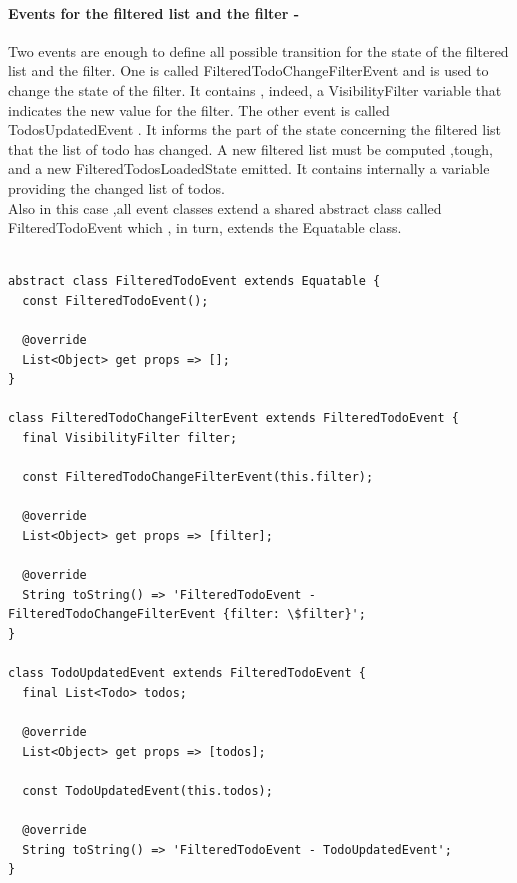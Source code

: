 \paragraph{Events for the filtered list and the filter - }
\label{subpar:todo_app_bloc_core_state}

Two events are enough to define all possible transition for the state of the filtered list and the filter. One is called FilteredTodoChangeFilterEvent and is used to change the state of the filter. It contains , indeed, a VisibilityFilter variable  that indicates the new value for the filter. The other event is called TodosUpdatedEvent . It informs the part of the state concerning the filtered list that the list of todo has changed. A new filtered list must be computed ,tough, and a new FilteredTodosLoadedState emitted. It contains internally a variable providing the changed list of todos.\\
Also in this case ,all event classes extend a shared abstract class called FilteredTodoEvent which , in turn, extends the Equatable class. 

\begin{code}
\mbox{}
 \mbox{}
\label{code:2.14}
\begin{verbatim}

abstract class FilteredTodoEvent extends Equatable {
  const FilteredTodoEvent();

  @override
  List<Object> get props => [];
}

class FilteredTodoChangeFilterEvent extends FilteredTodoEvent {
  final VisibilityFilter filter;

  const FilteredTodoChangeFilterEvent(this.filter);

  @override
  List<Object> get props => [filter];

  @override
  String toString() => 'FilteredTodoEvent - FilteredTodoChangeFilterEvent {filter: \$filter}';
}

class TodoUpdatedEvent extends FilteredTodoEvent {
  final List<Todo> todos;

  @override
  List<Object> get props => [todos];

  const TodoUpdatedEvent(this.todos);

  @override
  String toString() => 'FilteredTodoEvent - TodoUpdatedEvent';
}
\end{verbatim}
\mbox{}
\end{code}


